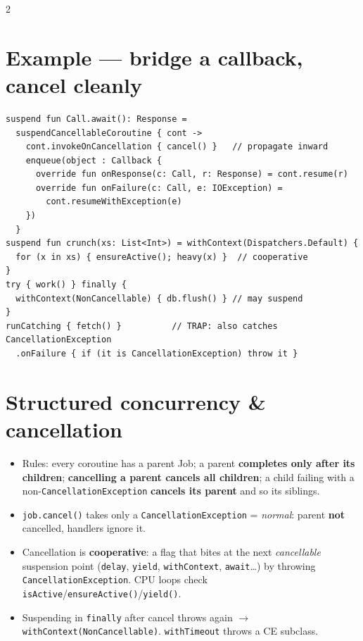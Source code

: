 \documentclass[8pt]{extarticle}
\begin{document}
\begin{multicols}{2}
\section{Example — bridge a callback, cancel cleanly}
\begin{lstlisting}[language=KotlinSheet]
suspend fun Call.await(): Response =
  suspendCancellableCoroutine { cont ->
    cont.invokeOnCancellation { cancel() }   // propagate inward
    enqueue(object : Callback {
      override fun onResponse(c: Call, r: Response) = cont.resume(r)
      override fun onFailure(c: Call, e: IOException) =
        cont.resumeWithException(e)
    })
  }
suspend fun crunch(xs: List<Int>) = withContext(Dispatchers.Default) {
  for (x in xs) { ensureActive(); heavy(x) }  // cooperative
}
try { work() } finally {
  withContext(NonCancellable) { db.flush() } // may suspend
}
runCatching { fetch() }          // TRAP: also catches CancellationException
  .onFailure { if (it is CancellationException) throw it }
\end{lstlisting}

\columnbreak

\section{Structured concurrency \& cancellation}
\begin{itemize}\raggedright
  \item Rules: every coroutine has a parent Job; a parent \textbf{completes only after its
        children}; \textbf{cancelling a parent cancels all children}; a child failing with a
        non-\texttt{CancellationException} \textbf{cancels its parent} and so its siblings.
  \item \texttt{job.cancel()} takes only a \texttt{CancellationException} = \emph{normal}:
        parent \textbf{not} cancelled, handlers ignore it.
  \item Cancellation is \textbf{cooperative}: a flag that bites at the next
        \emph{cancellable} suspension point (\texttt{delay}, \texttt{yield},
        \texttt{withContext}, \texttt{await}…) by throwing \texttt{CancellationException}.
        CPU loops check \texttt{isActive}/\texttt{ensureActive()}/\texttt{yield()}.
  \item Suspending in \texttt{finally} after cancel throws again $\to$
        \texttt{withContext(NonCancellable)}. \texttt{withTimeout} throws a CE subclass.
\end{itemize}


\end{multicols}
\end{document}
